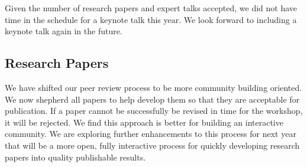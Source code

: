 \documentclass{llncs}
\begin{document}
Given the number of research papers and expert talks accepted, we did not have time in the schedule for a keynote talk this year. We look forward to including a keynote talk again in the future. 


\subsection{Research Papers}

We have shifted our peer review process to be more community building oriented. We now shepherd all papers to help develop them so that they are acceptable for publication. If a paper cannot be successfully be revised in time for the workshop, it will be rejected. We find this approach is better for building an interactive community. We are exploring further enhancements to this process for next year that will be a more open, fully interactive process for quickly developing research papers into quality publishable results.
\end{document}
